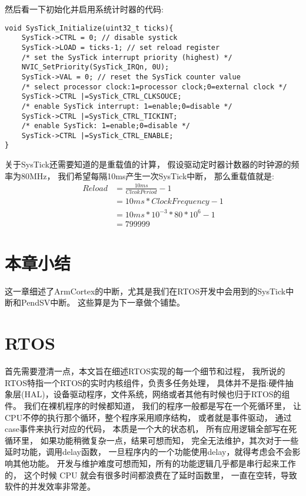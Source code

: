 然后看一下初始化并启用系统计时器的代码:
\begin{lstlisting}[language={[ANSI]C},keywordstyle=\color{blue!70},commentstyle=\color{red!50!green!50!blue!50},frame=shadowbox, rulesepcolor=\color{red!20!green!20!blue!20}]
void SysTick_Initialize(uint32_t ticks){
    SysTick->CTRL = 0; // disable systick
    SysTick->LOAD = ticks-1; // set reload register
    /* set the SysTick interrupt priority (highest) */
    NVIC_SetPriority(SysTick_IRQn, 0U);
    SysTick->VAL = 0; // reset the SysTick counter value
    /* select processor clock:1=processor clock;0=external clock */
    SysTick->CTRL |=SysTick_CTRL_CLKSOUCE;
    /* enable SysTick interrupt: 1=enable;0=disable */
    SysTick->CTRL |=SysTick_CTRL_TICKINT;
    /* enable SysTick: 1=enable;0=disable */
    SysTick->CTRL |=SysTick_CTRL_ENABLE;
}
\end{lstlisting}

关于SysTick还需要知道的是重载值的计算，
假设驱动定时器计数器的时钟源的频率为80MHz，
我们希望每隔10ms产生一次SysTick中断，
那么重载值就是:
\begin{align*}
    Reload &= \frac{10ms}{Clcok Period}-1 \\
             &= 10ms * ClockFrequency -1 \\
             &=10ms * 10^{-3} * 80 * 10^{6} -1 \\
             &=799999
\end{align*}

\section{本章小结}
这一章细述了ArmCortex的中断，尤其是我们在RTOS开发中会用到的SysTick中断和PendSV\cite{bungoarm}中断。
这些算是为下一章做个铺垫。
\section{RTOS}
首先需要澄清一点，本文旨在细述RTOS实现的每一个细节和过程，
我所说的RTOS特指一个RTOS的实时内核组件，负责多任务处理，
具体并不是指:硬件抽象层(HAL)，设备驱动程序，文件系统，网络或者其他有时候也归于RTOS的组件。
我们在裸机程序的时候都知道，
我们的程序一般都是写在一个死循环里，
让CPU不停的执行那个循环，整个程序采用顺序结构，
或者就是事件驱动，
通过case事件来执行对应的代码，
本质是一个大的状态机，
所有应用逻辑全部写在死循环里，
如果功能稍微复杂一点，结果可想而知，
完全无法维护，其次对于一些延时功能，调用delay函数，
一旦程序内的一个功能使用delay，就得考虑会不会影响其他功能。
开发与维护难度可想而知，所有的功能逻辑几乎都是串行起来工作的，
这个时候 CPU 就会有很多时间都浪费在了延时函数里，
一直在空转，导致软件的并发效率非常差。


